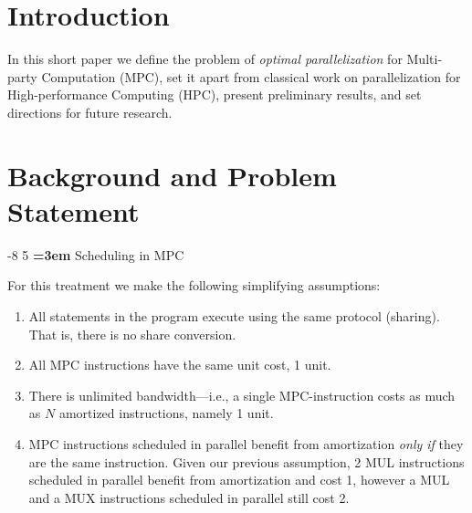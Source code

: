 \documentclass[sigconf, screen, natbib=false, dvipsnames, table]{acmart}
\makeatletter
\renewcommand{\subsection}{\@startsection{subsection}{2}{\z@}%
                        {-8\p@ \@plus -4\p@ \@minus -4\p@}%
                        {5\p@ \@plus 2\p@ \@minus 2\p@}%
                        {\normalfont\Large\bfseries\boldmath
                         \rightskip=\z@ \@plus 3em\pretolerance=10000 }}
\theoremstyle{definition}
\makeatother
\begin{document}
\section{Introduction}
\label{sec:introduction}

In this short paper we define the problem of \emph{optimal parallelization} for Multi-party Computation (MPC), 
set it apart from classical work on parallelization for High-performance Computing (HPC), present preliminary 
results, and set directions for future research. 







\section{Background and Problem Statement}
\label{sec:background}

\subsection{Scheduling in MPC}


For this treatment we make the following simplifying assumptions:

\begin{enumerate}
\item All statements in the program execute using the same protocol (sharing). That is, there is no share conversion.
\item All MPC instructions have the same unit cost, 1 unit.
\item There is unlimited bandwidth---i.e., a single MPC-instruction costs as much as $N$ amortized instructions, namely 1 unit.
\item MPC instructions scheduled in parallel benefit from amortization \emph{only if} they are the same instruction. Given our previous assumption, 
2 MUL instructions scheduled in parallel benefit from amortization and cost 1, however a MUL and a MUX instructions scheduled 
in parallel still cost 2.
\end{enumerate}
\end{document}
